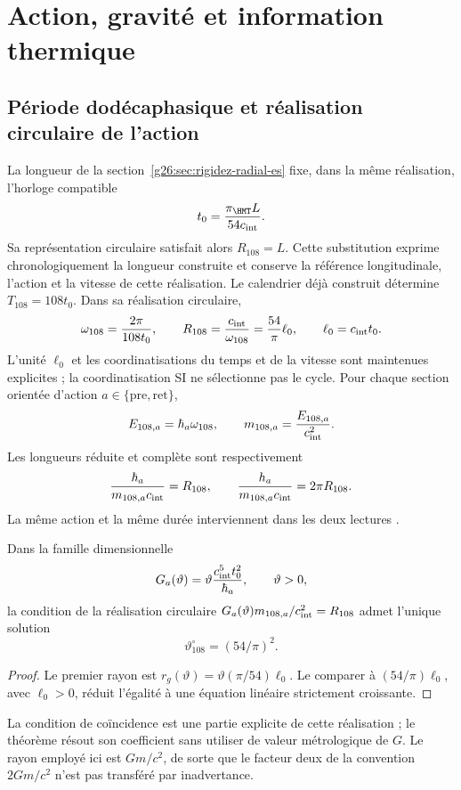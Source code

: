 \section{Action, gravité et information thermique}
\label{v:ant:sec:gravity}
\subsection{Période dodécaphasique et réalisation circulaire de l'action}
La longueur de la section~\ref{g26:sec:rigidez-radial-es} fixe, dans
la même réalisation, l'horloge compatible
\[
 t_0=\frac{\pi_{\HMT}L}{54c_{\rm int}}.
\]
Sa représentation circulaire satisfait alors \(R_{108}=L\). Cette
substitution exprime chronologiquement la longueur construite et conserve
la référence longitudinale, l’action et la vitesse de cette réalisation.
Le calendrier déjà construit détermine $T_{108}=108t_0$.
Dans sa réalisation circulaire,
\[
\omega_{108}=\frac{2\pi}{108t_0},\qquad
R_{108}=\frac{c_{\rm int}}{\omega_{108}}
=\frac{54}{\pi}\ell_0,\qquad \ell_0=c_{\rm int}t_0.
\]
L’unité $\ell_0$ et les coordinatisations du temps et de la vitesse sont maintenues
explicites ; la coordinatisation SI ne sélectionne pas le cycle.
Pour chaque section orientée d’action $a\in\{\mathrm{pre},\mathrm{ret}\}$,
\[
E_{108,a}=\hbar_a\omega_{108},\qquad
m_{108,a}=\frac{E_{108,a}}{c_{\rm int}^2}.
\]
Les longueurs réduite et complète sont respectivement
\[
\frac{\hbar_a}{m_{108,a}c_{\rm int}}=R_{108},
\qquad
\frac{h_a}{m_{108,a}c_{\rm int}}=2\pi R_{108}.
\]
La même action et la même durée interviennent dans les deux lectures
.

\begin{proposition}
Dans la famille dimensionnelle
\[
G_a(\vartheta)=\vartheta\frac{c_{\rm int}^5t_0^2}{\hbar_a},
\qquad \vartheta>0,
\]
la condition de la réalisation circulaire
$G_a(\vartheta)m_{108,a}/c_{\rm int}^2=R_{108}$
admet l'unique solution
\[
\vartheta^\circ_{108}=(54/\pi)^2.
\]
\end{proposition}
\begin{proof}
Le premier rayon est
$r_g(\vartheta)=\vartheta(\pi/54)\ell_0$.
Le comparer à $(54/\pi)\ell_0$, avec $\ell_0>0$, réduit
l'égalité à une équation linéaire strictement croissante.
\end{proof}
La condition de coïncidence est une partie explicite de cette réalisation ;
le théorème résout son coefficient sans utiliser de valeur métrologique de $G$.
Le rayon employé ici est $Gm/c^2$, de sorte que le facteur deux
de la convention $2Gm/c^2$ n'est pas transféré par inadvertance.

